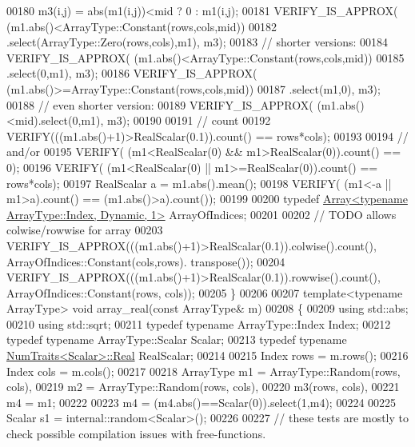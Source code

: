 \begin{DoxyCode}
00180     m3(i,j) = abs(m1(i,j))<mid ? 0 : m1(i,j);
00181   VERIFY\_IS\_APPROX( (m1.abs()<ArrayType::Constant(rows,cols,mid))
00182                         .select(ArrayType::Zero(rows,cols),m1), m3);
00183   \textcolor{comment}{// shorter versions:}
00184   VERIFY\_IS\_APPROX( (m1.abs()<ArrayType::Constant(rows,cols,mid))
00185                         .select(0,m1), m3);
00186   VERIFY\_IS\_APPROX( (m1.abs()>=ArrayType::Constant(rows,cols,mid))
00187                         .select(m1,0), m3);
00188   \textcolor{comment}{// even shorter version:}
00189   VERIFY\_IS\_APPROX( (m1.abs()<mid).select(0,m1), m3);
00190 
00191   \textcolor{comment}{// count}
00192   VERIFY(((m1.abs()+1)>RealScalar(0.1)).count() == rows*cols);
00193 
00194   \textcolor{comment}{// and/or}
00195   VERIFY( (m1<RealScalar(0) && m1>RealScalar(0)).count() == 0);
00196   VERIFY( (m1<RealScalar(0) || m1>=RealScalar(0)).count() == rows*cols);
00197   RealScalar a = m1.abs().mean();
00198   VERIFY( (m1<-a || m1>a).count() == (m1.abs()>a).count());
00199 
00200   \textcolor{keyword}{typedef} \hyperlink{group___core___module_class_eigen_1_1_array}{Array<typename ArrayType::Index, Dynamic, 1>} 
      ArrayOfIndices;
00201 
00202   \textcolor{comment}{// TODO allows colwise/rowwise for array}
00203   VERIFY\_IS\_APPROX(((m1.abs()+1)>RealScalar(0.1)).colwise().count(), ArrayOfIndices::Constant(cols,rows).
      transpose());
00204   VERIFY\_IS\_APPROX(((m1.abs()+1)>RealScalar(0.1)).rowwise().count(), ArrayOfIndices::Constant(rows, cols));
00205 \}
00206 
00207 \textcolor{keyword}{template}<\textcolor{keyword}{typename} ArrayType> \textcolor{keywordtype}{void} array\_real(\textcolor{keyword}{const} ArrayType& m)
00208 \{
00209   \textcolor{keyword}{using} std::abs;
00210   \textcolor{keyword}{using} std::sqrt;
00211   \textcolor{keyword}{typedef} \textcolor{keyword}{typename} ArrayType::Index Index;
00212   \textcolor{keyword}{typedef} \textcolor{keyword}{typename} ArrayType::Scalar Scalar;
00213   \textcolor{keyword}{typedef} \textcolor{keyword}{typename} \hyperlink{group___core___module_struct_eigen_1_1_num_traits}{NumTraits<Scalar>::Real} RealScalar;
00214 
00215   Index rows = m.rows();
00216   Index cols = m.cols();
00217 
00218   ArrayType m1 = ArrayType::Random(rows, cols),
00219             m2 = ArrayType::Random(rows, cols),
00220             m3(rows, cols),
00221             m4 = m1;
00222 
00223   m4 = (m4.abs()==Scalar(0)).select(1,m4);
00224 
00225   Scalar  s1 = internal::random<Scalar>();
00226 
00227   \textcolor{comment}{// these tests are mostly to check possible compilation issues with free-functions.}

\end{DoxyCode}
